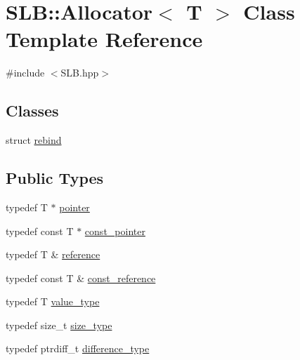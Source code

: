 \hypertarget{classSLB_1_1Allocator}{}\section{S\+LB\+:\+:Allocator$<$ T $>$ Class Template Reference}
\label{classSLB_1_1Allocator}


{\ttfamily \#include $<$S\+L\+B.\+hpp$>$}

\subsection*{Classes}
\begin{DoxyCompactItemize}
\item 
struct \hyperlink{structSLB_1_1Allocator_1_1rebind}{rebind}
\end{DoxyCompactItemize}
\subsection*{Public Types}
\begin{DoxyCompactItemize}
\item 
typedef T $\ast$ \hyperlink{classSLB_1_1Allocator_aae4ca3972f504938f16542e0eeb295ac}{pointer}
\item 
typedef const T $\ast$ \hyperlink{classSLB_1_1Allocator_afeaf038648f7c641b18ed9e8eac80daf}{const\+\_\+pointer}
\item 
typedef T \& \hyperlink{classSLB_1_1Allocator_acf01b8e7caf65e4204d91462b61d65f3}{reference}
\item 
typedef const T \& \hyperlink{classSLB_1_1Allocator_a3160607e8b4d40191536eeecef84b8b2}{const\+\_\+reference}
\item 
typedef T \hyperlink{classSLB_1_1Allocator_aa7059448157f4fb75e7609ddc0ec1f1b}{value\+\_\+type}
\item 
typedef size\+\_\+t \hyperlink{classSLB_1_1Allocator_ab5b27ae3bc010c6a60b3ec7f9bdbd06f}{size\+\_\+type}
\item 
typedef ptrdiff\+\_\+t \hyperlink{classSLB_1_1Allocator_af90331221b13541f9b95df3ae4ba03f5}{difference\+\_\+type}
\end{DoxyCompactItemize}
